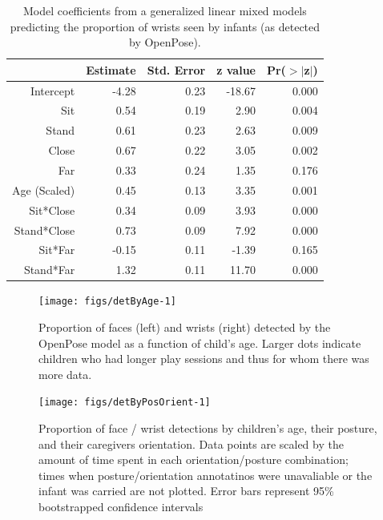 \documentclass[english,man,floatsintext]{apa6}
\begin{document}
\begin{table}[ht]
\centering
\begin{tabular}{rrrrr}
  \hline
 & Estimate & Std. Error & z value & Pr($>$$|$z$|$) \\
  \hline
Intercept & -4.28 & 0.23 & -18.67 & 0.000 \\
  Sit & 0.54 & 0.19 & 2.90 & 0.004 \\
  Stand & 0.61 & 0.23 & 2.63 & 0.009 \\
  Close & 0.67 & 0.22 & 3.05 & 0.002 \\
  Far & 0.33 & 0.24 & 1.35 & 0.176 \\
  Age (Scaled) & 0.45 & 0.13 & 3.35 & 0.001 \\
  Sit*Close & 0.34 & 0.09 & 3.93 & 0.000 \\
  Stand*Close & 0.73 & 0.09 & 7.92 & 0.000 \\
  Sit*Far & -0.15 & 0.11 & -1.39 & 0.165 \\
  Stand*Far & 1.32 & 0.11 & 11.70 & 0.000 \\
   \hline
\end{tabular}
\caption{Model coefficients from a generalized linear mixed models predicting the proportion of wrists seen by infants (as detected by OpenPose).}
\end{table}

\begin{figure}[!h]

{\centering \texttt{[image: figs/detByAge-1]} 

}

\caption{Proportion of faces (left) and wrists (right) detected by the OpenPose model as a function of child's age. Larger dots indicate children who had longer play sessions and thus for whom there was more data.}\label{fig:detByAge}
\end{figure}

\begin{figure}[!h]

{\centering \texttt{[image: figs/detByPosOrient-1]} 

}

\caption{Proportion of face / wrist detections by children's age, their posture, and their caregivers orientation. Data points are scaled by the amount of time spent in each orientation/posture combination; times when posture/orientation annotatinos were unavaliable or the infant was carried are not plotted. Error bars represent 95\% bootstrapped confidence intervals}\label{fig:detByPosOrient}
\end{figure}
\end{document}
